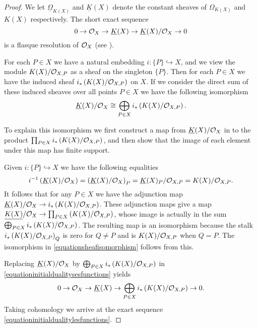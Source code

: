     \begin{proof}
    We let $\underline{\Omega}_{K(X)}$ and $\underline{K}(X)$ denote the constant sheaves of $\Omega_{K(X)}$ and $K(X)$ respectively.
    The short exact sequence
        \begin{equation}\label{equationinitialdualitysesfunctions}
        0 \rightarrow {\cal O}_X \rightarrow \underline{K}(X) \rightarrow \underline{K}(X)/{\cal O}_X \rightarrow 0
        \end{equation}
    is a flasque resolution of ${\cal O}_X$ (see \cite[Chap.\ II, ex.\ 1.16]{hart}).
    
    For each $P \in X$ we have a natural embedding $i\colon \{P\} \hookrightarrow X$, and we view the module $K(X)/{\cal O}_{X,P}$ as a sheaf on the singleton $\{P\}$.
    Then for each $P\in X$ we have the induced sheaf $i_*\left( K(X)/{\cal O}_{X,P} \right)$ on $X$.
    If we consider the direct sum of these induced sheaves over all points $P\in X$ we have the following isomorphism
        \begin{equation}\label{equationsheafisomorphism}
        \underline{K}(X)/{\cal O}_X\cong \bigoplus_{P\in X} i_*\left(K(X)/{\cal O}_{X,P}\right).
        \end{equation}
    
    
    To explain this isomorphism we first construct a map from $\underline{K}(X)/{\cal O}_X$ in to the product $\prod_{P \in X} i_*\left({K(X)}/{\cal O}_{X,P}\right)$, and then show that the image of each element under this map has finite support.
    
    Given $i\colon \{P\} \hookrightarrow X$ we have the following equalities
        \begin{equation*}
        i^{-1}\left(\underline{K}(X)/{\cal O}_X\right) = \left(\underline{K}(X)/{\cal O}_X\right)_P  = \underline{K}(X)_P/{\cal O}_{X,P}  = K(X)/{\cal O}_{X,P}.
        \end{equation*}
    It follows that for any $P \in X$ we have the adjunction map $\underline{K}(X)/{\cal O}_X \rightarrow i_* \left( K(X)/{\cal O}_{X,P} \right)$.
    These adjunction maps give a map $\underline{K(X)}/{\cal O}_X \rightarrow \prod_{P \in X}\left( K(X)/{\cal O}_{X,P} \right)$, whose image is actually in the sum $\bigoplus_{P \in X} i_*\left(K(X)/{\cal O}_{X,P} \right)$.
    The resulting map is an isomorphism because the stalk $i_*\left( K(X)/{\cal O}_{X,P} \right)_Q$ is zero for $Q \neq P$ and is $K(X)/{\cal O}_{X,P}$ when $Q = P$. 
    The isomorphism in \eqref{equationsheafisomorphism} follows from this.
    
    Replacing $\underline{K}(X)/{\cal O}_X$ by $\bigoplus_{P\in X} i_*\left(K(X)/{\cal O}_{X,P}\right)$ in \eqref{equationinitialdualitysesfunctions} yields
        \begin{equation}\label{equationshortexactsequencefunctionsdirectsum}
        0 \rightarrow {\cal O}_X \rightarrow \underline{K}(X) \rightarrow \bigoplus_{P \in X}i_* \left( K(X)/{\cal O}_{X,P} \right) \rightarrow 0.
        \end{equation}
    Taking cohomology we arrive at the exact sequence \eqref{equationinitialdualitylesfunctions}.
    

\end{proof}
